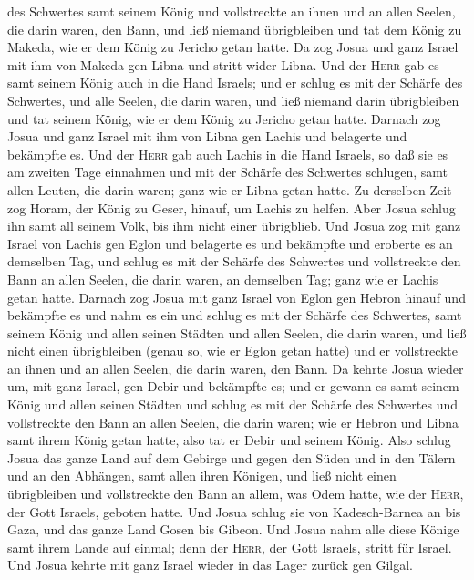 des Schwertes samt seinem König und vollstreckte an ihnen und an allen
Seelen, die darin waren, den Bann, und ließ niemand übrigbleiben und tat
dem König zu Makeda, wie er dem König zu Jericho getan hatte.
 Da zog Josua und ganz Israel mit ihm von Makeda gen
Libna und stritt wider Libna.  Und der \textsc{Herr} gab
es samt seinem König auch in die Hand Israels; und er schlug es mit der
Schärfe des Schwertes, und alle Seelen, die darin waren, und ließ
niemand darin übrigbleiben und tat seinem König, wie er dem König zu
Jericho getan hatte.  Darnach zog Josua und ganz Israel
mit ihm von Libna gen Lachis und belagerte und bekämpfte es.
 Und der \textsc{Herr} gab auch Lachis in die Hand
Israels, so daß sie es am zweiten Tage einnahmen und mit der Schärfe des
Schwertes schlugen, samt allen Leuten, die darin waren; ganz wie er
Libna getan hatte.  Zu derselben Zeit zog Horam, der
König zu Geser, hinauf, um Lachis zu helfen. Aber Josua schlug ihn samt
all seinem Volk, bis ihm nicht einer übrigblieb.  Und
Josua zog mit ganz Israel von Lachis gen Eglon und belagerte es und
bekämpfte  und eroberte es an demselben Tag, und schlug
es mit der Schärfe des Schwertes und vollstreckte den Bann an allen
Seelen, die darin waren, an demselben Tag; ganz wie er Lachis getan
hatte.  Darnach zog Josua mit ganz Israel von Eglon gen
Hebron hinauf und bekämpfte es  und nahm es ein und
schlug es mit der Schärfe des Schwertes, samt seinem König und allen
seinen Städten und allen Seelen, die darin waren, und ließ nicht einen
übrigbleiben (genau so, wie er Eglon getan hatte) und er vollstreckte an
ihnen und an allen Seelen, die darin waren, den Bann.  Da
kehrte Josua wieder um, mit ganz Israel, gen Debir und bekämpfte es;
 und er gewann es samt seinem König und allen seinen
Städten und schlug es mit der Schärfe des Schwertes und vollstreckte den
Bann an allen Seelen, die darin waren; wie er Hebron und Libna samt
ihrem König getan hatte, also tat er Debir und seinem König.
 Also schlug Josua das ganze Land auf dem Gebirge und
gegen den Süden und in den Tälern und an den Abhängen, samt allen ihren
Königen, und ließ nicht einen übrigbleiben und vollstreckte den Bann an
allem, was Odem hatte, wie der \textsc{Herr}, der Gott Israels, geboten
hatte.  Und Josua schlug sie von Kadesch-Barnea an bis
Gaza, und das ganze Land Gosen bis Gibeon.  Und Josua
nahm alle diese Könige samt ihrem Lande auf einmal; denn der
\textsc{Herr}, der Gott Israels, stritt für Israel.  Und
Josua kehrte mit ganz Israel wieder in das Lager zurück gen Gilgal.

